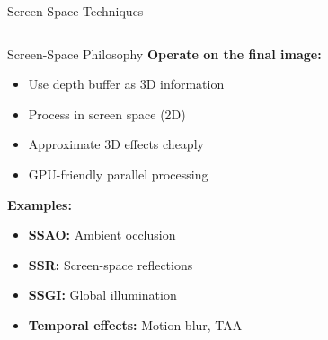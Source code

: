 \begin{frame}{Screen-Space Techniques}
  \begin{columns}
    \begin{column}{0.6\textwidth}
      \begin{raybox}{Screen-Space Philosophy}
        \textbf{Operate on the final image:}
        \begin{itemize}
          \item Use depth buffer as 3D information
          \item Process in screen space (2D)
          \item Approximate 3D effects cheaply
          \item GPU-friendly parallel processing
        \end{itemize}

        \vspace{0.3cm}
        \textbf{Examples:}
        \begin{itemize}
          \item \textbf{SSAO:} Ambient occlusion
          \item \textbf{SSR:} Screen-space reflections
          \item \textbf{SSGI:} Global illumination
          \item \textbf{Temporal effects:} Motion blur, TAA
        \end{itemize}
      \end{raybox}
    \end{column}
    \begin{column}{0.4\textwidth}
\end{column}
\end{columns}
\end{frame}
